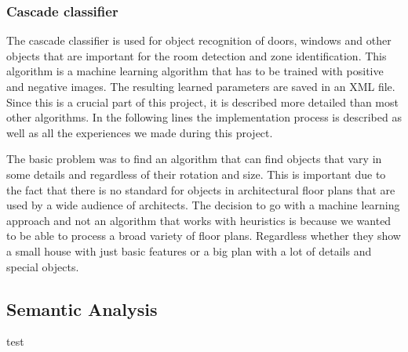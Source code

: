 \subsubsection{Cascade classifier}
The cascade classifier is used for object recognition of doors, windows and other objects that are important for the room detection and zone identification. This algorithm is a machine learning algorithm that has to be trained with positive and negative images. The resulting learned parameters are saved in an XML file. Since this is a crucial part of this project, it is described more detailed than most other algorithms. In the following lines the implementation process is described as well as all the experiences we made during this project.

The basic problem was to find an algorithm that can find objects that vary in some details and regardless of their rotation and size. This is important due to the fact that there is no standard for objects in architectural floor plans that are used by a wide audience of architects. The decision to go with a machine learning approach and not an algorithm that works with heuristics is because we wanted to be able to process a broad variety of floor plans. Regardless whether they show a small house with just basic features or a big plan with a lot of details and special objects.

\subsection{Semantic Analysis}
test
